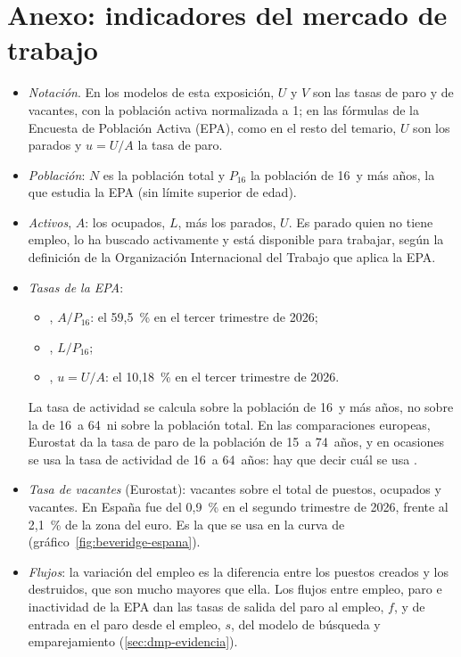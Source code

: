 \documentclass[11pt]{article}
\begin{document}
\section{Anexo: indicadores del mercado de trabajo}\label{anexo:indicadores}

\begin{itemize}
\item \emph{Notación}. En los modelos de esta exposición, $U$ y $V$ son las tasas de paro y de vacantes, con la población activa normalizada a 1; en las fórmulas de la Encuesta de Población Activa (EPA), como en el resto del temario, $U$ son los parados y $u=U/A$ la tasa de paro.
\item \emph{Población}: $N$ es la población total y $P_{16}$ la población de 16~y más años, la que estudia la EPA (sin límite superior de edad).
\item \emph{Activos}, $A$: los ocupados, $L$, más los parados, $U$. Es parado quien no tiene empleo, lo ha buscado activamente y está disponible para trabajar, según la definición de la Organización Internacional del Trabajo que aplica la EPA\nocite{OIT2013Resolucion,INE2026EPA3T}.
\item \emph{Tasas de la EPA}:
  \begin{itemize}
  \item {}, $A/P_{16}$: el 59,5~\% en el tercer trimestre de 2026\nocite{INE2026EPA3T};
  \item {}, $L/P_{16}$;
  \item {}, $u=U/A$: el 10,18~\% en el tercer trimestre de 2026\nocite{INE2026EPA3T}.
  \end{itemize}
  La tasa de actividad se calcula sobre la población de 16~y más años, no sobre la de 16~a 64~ni sobre la población total. En las comparaciones europeas, Eurostat da la tasa de paro de la población de 15~a 74~años\nocite{Eurostat2026une}, y en ocasiones se usa la tasa de actividad de 16~a 64~años: hay que decir cuál se usa .
\item \emph{Tasa de vacantes} (Eurostat): vacantes sobre el total de puestos, ocupados y vacantes. En España fue del 0,9~\% en el segundo trimestre de 2026, frente al 2,1~\% de la zona del euro\nocite{Eurostat2026jvs}. Es la que se usa en la curva de  (gráfico~\ref{fig:beveridge-espana}).
\item \emph{Flujos}: la variación del empleo es la diferencia entre los puestos creados y los destruidos, que son mucho mayores que ella\nocite{DavisHaltiwanger1992Gross}. Los flujos entre empleo, paro e inactividad de la EPA dan las tasas de salida del paro al empleo, $f$, y de entrada en el paro desde el empleo, $s$, del modelo de búsqueda y emparejamiento\nocite{INE2026EPAFlujos} (\ref{sec:dmp-evidencia}).
\end{itemize}
\end{document}
